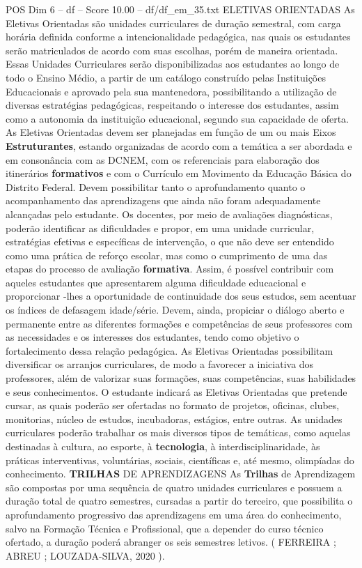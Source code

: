 \begin{textsample}{POS Dim 6 – df – Score 10.00 – df/df\_em\_35.txt}  \label{ex:f6_pos_122}
ELETIVAS ORIENTADAS As Eletivas Orientadas são unidades curriculares de duração semestral, com carga horária definida conforme a intencionalidade pedagógica, nas quais os estudantes serão matriculados de acordo com suas escolhas, porém de maneira orientada.
Essas Unidades Curriculares serão disponibilizadas aos estudantes ao longo de todo o Ensino Médio, a partir de um catálogo construído pelas Instituições Educacionais e aprovado pela sua mantenedora, possibilitando a utilização de diversas estratégias pedagógicas, respeitando o interesse dos estudantes, assim como a autonomia da instituição educacional, segundo sua capacidade de oferta.
As Eletivas Orientadas devem ser planejadas em função de um ou mais Eixos \textbf{Estruturantes}, estando organizadas de acordo com a temática a ser abordada e em consonância com as DCNEM, com os referenciais para elaboração dos itinerários \textbf{formativos} e com o Currículo em Movimento da Educação Básica do Distrito Federal.
Devem possibilitar tanto o aprofundamento quanto o acompanhamento das aprendizagens que ainda não foram adequadamente alcançadas pelo estudante.
Os docentes, por meio de avaliações diagnósticas, poderão identificar as dificuldades e propor, em uma unidade curricular, estratégias efetivas e específicas de intervenção, o que não deve ser entendido como uma prática de reforço escolar, mas como o cumprimento de uma das etapas do processo de avaliação \textbf{formativa}.
Assim, é possível contribuir com aqueles estudantes que apresentarem alguma dificuldade educacional e proporcionar -lhes a oportunidade de continuidade dos seus estudos, sem acentuar os índices de defasagem idade/série.
Devem, ainda, propiciar o diálogo aberto e permanente entre as diferentes formações e competências de seus professores com as necessidades e os interesses dos estudantes, tendo como objetivo o fortalecimento dessa relação pedagógica.
As Eletivas Orientadas possibilitam diversificar os arranjos curriculares, de modo a favorecer a iniciativa dos professores, além de valorizar suas formações, suas competências, suas habilidades e seus conhecimentos.
O estudante indicará as Eletivas Orientadas que pretende cursar, as quais poderão ser ofertadas no formato de projetos, oficinas, clubes, monitorias, núcleo de estudos, incubadoras, estágios, entre outras.
As unidades curriculares poderão trabalhar os mais diversos tipos de temáticas, como aquelas destinadas à cultura, ao esporte, à \textbf{tecnologia}, à interdisciplinaridade, às práticas interventivas, voluntárias, sociais, científicas e, até mesmo, olimpíadas do conhecimento. \textbf{TRILHAS} DE APRENDIZAGENS As \textbf{Trilhas} de Aprendizagem são compostas por uma sequência de quatro unidades curriculares e possuem a duração total de quatro semestres, cursadas a partir do terceiro, que possibilita o aprofundamento progressivo das aprendizagens em uma área do conhecimento, salvo na Formação Técnica e Profissional, que a depender do curso técnico ofertado, a duração poderá abranger os seis semestres letivos. ( FERREIRA ; ABREU ; LOUZADA-SILVA, 2020 ).

\end{textsample}
